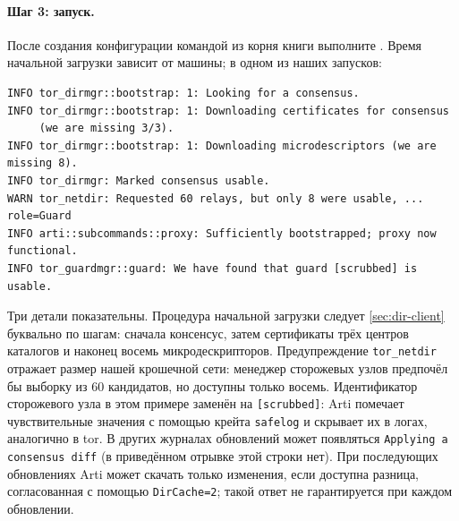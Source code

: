 \paragraph{Шаг 3: запуск.} После создания конфигурации командой  из корня книги выполните . Время начальной загрузки зависит от машины; в одном из наших запусков:
\begin{lstlisting}[numbers=none]
INFO tor_dirmgr::bootstrap: 1: Looking for a consensus.
INFO tor_dirmgr::bootstrap: 1: Downloading certificates for consensus
     (we are missing 3/3).
INFO tor_dirmgr::bootstrap: 1: Downloading microdescriptors (we are missing 8).
INFO tor_dirmgr: Marked consensus usable.
WARN tor_netdir: Requested 60 relays, but only 8 were usable, ...  role=Guard
INFO arti::subcommands::proxy: Sufficiently bootstrapped; proxy now functional.
INFO tor_guardmgr::guard: We have found that guard [scrubbed] is usable.
\end{lstlisting}
Три детали показательны. Процедура начальной загрузки следует \cref{sec:dir-client} буквально по шагам: сначала консенсус, затем сертификаты трёх центров каталогов и наконец восемь микродескрипторов. Предупреждение \texttt{tor\_netdir} отражает размер нашей крошечной сети: менеджер сторожевых узлов предпочёл бы выборку из 60 кандидатов, но доступны только восемь. Идентификатор сторожевого узла в этом примере заменён на \texttt{[scrubbed]}: Arti помечает чувствительные значения с помощью крейта \texttt{safelog} и скрывает их в логах, аналогично  в tor. В других журналах обновлений может появляться \texttt{Applying a consensus diff} (в приведённом отрывке этой строки нет). При последующих обновлениях Arti может скачать только изменения, если доступна разница, согласованная с помощью \texttt{DirCache=2}; такой ответ не гарантируется при каждом обновлении.

